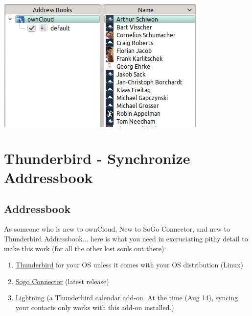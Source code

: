 \documentclass[letterpaper,10pt,english]{sphinxmanual}
\begin{document}
\includegraphics{kdes.png}


\section{Thunderbird - Synchronize Addressbook}
\label{pim/sync_thunderbird::doc}\label{pim/sync_thunderbird:thunderbird-synchronize-addressbook}

\subsection{Addressbook}
\label{pim/sync_thunderbird:addressbook}
As someone who is new to ownCloud, New to SoGo Connector, and new to Thunderbird Addressbook... here is what you need in excruciating pithy detail to make this work (for all the other lost souls out there):
\begin{enumerate}
\item {} 
\href{http://www.mozilla.org/en-US/thunderbird/}{Thunderbird} for your OS unless it comes with your OS distribution (Linux)

\item {} 
\href{http://www.sogo.nu/downloads/frontends.html}{Sogo Connector} (latest release)

\item {} 
\href{https://addons.mozilla.org/en-US/thunderbird/addon/lightning/}{Lightning} (a Thunderbird calendar add-on. At the time (Aug 14), syncing your contacts only works with this add-on installed.)

\end{enumerate}
\end{document}
